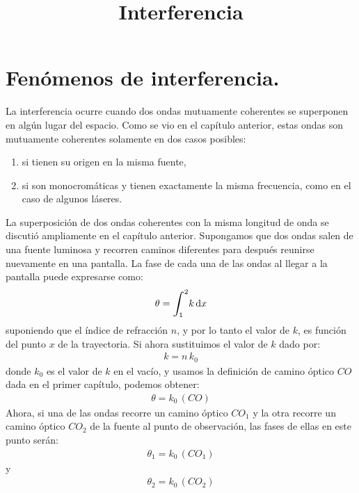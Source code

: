 \documentclass[14pt]{extarticle}
\title{\vspace*{-2cm} Interferencia}
\date{ }
\def\scaleint#1{\vcenter{\hbox{\scaleto[3ex]{\displaystyle\int}{#1}}}}
\def\bs{\mkern-12mu}
\begin{document}
\maketitle

\section{Fenómenos de interferencia.}

La interferencia ocurre cuando dos ondas mutuamente coherentes se superponen en algún lugar del espacio. Como se vio en el capítulo anterior, estas ondas son mutuamente coherentes solamente en dos casos posibles:
\begin{enumerate}[label=\alph*)]
\item si tienen su origen en la misma fuente,
\item si son monocromáticas y tienen exactamente la misma frecuencia, como en el caso de algunos láseres.
\end{enumerate}
La superposición de dos ondas coherentes con la misma longitud de onda se discutió ampliamente en el capítulo anterior. Supongamos que dos ondas salen de una fuente luminosa y recorren caminos diferentes para después reunirse nuevamente en una pantalla. La fase de cada una de las ondas al llegar a la pantalla puede expresarse como:
\begin{align}
\theta = \scaleint{6ex}_{\bs 1}^{2} k \dd{x}
\label{eq:ecuacion_IX_01}
\end{align}
suponiendo que el índice de refracción $n$, y por lo tanto el valor de $k$, es función del punto $x$ de la trayectoria. Si ahora sustituimos el valor de $k$ dado por:
\begin{align}
k = n \, k_{0}
\label{eq:ecuacion_IX_02}
\end{align}
donde $k_{0}$ es el valor de $k$ en el vacío, y usamos la definición de camino óptico $CO$ dada en el primer capítulo, podemos obtener:
\begin{align}
\theta = k_{0} \, (CO)
\label{eq:ecuacion_IX_03}
\end{align}
Ahora, si una de las ondas recorre un camino óptico $CO_{1}$ y la otra recorre un camino óptico $CO_{2}$ de la fuente al punto de observación, las fases de ellas en este punto serán:
\begin{align}
\theta_{1} = k_{0} \, (CO_{1})
\label{eq:ecuacion_IX_04}
\end{align}
y
\begin{align}
\theta_{2} = k_{0} \, (CO_{2})
\label{eq:ecuacion_IX_05}
\end{align}
\end{document}
